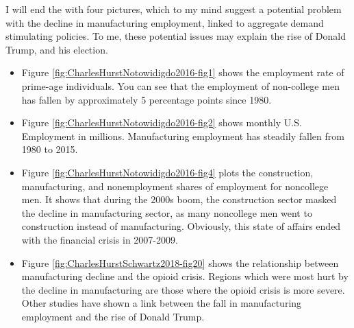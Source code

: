 \documentclass[]{book}
\begin{document}
I will end the with four pictures, which to my mind suggest a potential
problem with the decline in manufacturing employment, linked to
aggregate demand stimulating policies. To me, these potential issues may
explain the rise of Donald Trump, and his election.

\begin{itemize}
\item
  Figure \ref{fig:CharlesHurstNotowidigdo2016-fig1} shows the employment
  rate of prime-age individuals. You can see that the employment of
  non-college men has fallen by approximately 5 percentage points since
  1980.
\item
  Figure \ref{fig:CharlesHurstNotowidigdo2016-fig2} shows monthly U.S.
  Employment in millions. Manufacturing employment has steadily fallen
  from 1980 to 2015.
\item
  Figure \ref{fig:CharlesHurstNotowidigdo2016-fig4} plots the
  construction, manufacturing, and nonemployment shares of employment
  for noncollege men. It shows that during the 2000s boom, the
  construction sector masked the decline in manufacturing sector, as
  many noncollege men went to construction instead of manufacturing.
  Obviously, this state of affairs ended with the financial crisis in
  2007-2009.
\item
  Figure \ref{fig:CharlesHurstSchwartz2018-fig20} shows the relationship
  between manufacturing decline and the opioid crisis. Regions which
  were most hurt by the decline in manufacturing are those where the
  opioid crisis is more severe. Other studies have shown a link between
  the fall in manufacturing employment and the rise of Donald Trump.
\end{itemize}
\end{document}
